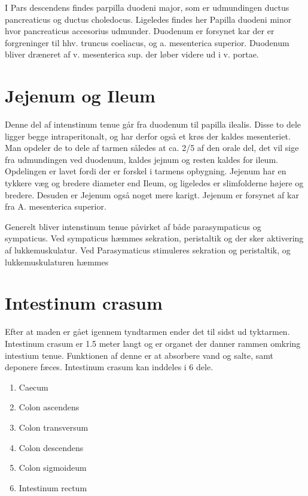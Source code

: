 	I Pars descendens findes parpilla duodeni major, som er udmundingen ductus pancreaticus og ductus choledocus. Ligeledes findes her Papilla duodeni minor hvor pancreaticus accesorius udmunder. Duodenum er forsynet kar der er forgreninger til hhv. truncus coeliacus, og a. mesenterica superior. Duodenum bliver dræneret af v. mesenterica sup. der løber videre ud i v. portae.
	
	\section{Jejenum og Ileum}
	
	Denne del af intenstinum tenue går fra duodenum til papilla ilealis. Disse to dele ligger begge intraperitonalt, og har derfor også et krøs der kaldes mesenteriet. Man opdeler de to dele af tarmen således at ca. 2/5 af den orale del, det vil sige fra udmundingen ved duodenum, kaldes jejnum og resten kaldes for ileum. Opdelingen er lavet fordi der er forskel i tarmens opbygning. Jejenum har en tykkere væg og bredere diameter end Ileum, og ligeledes er slimfolderne højere og bredere. Desuden er Jejenum også noget mere karigt. Jejenum er forsynet af kar fra A. mesenterica superior.
	
	
	Generelt bliver intenstinum tenue påvirket af både parasympaticus og sympaticus. Ved sympaticus hæmmes sekration, peristaltik og der sker aktivering af lukkemuskulatur. Ved Parasymaticus stimuleres sekration og peristaltik, og lukkemuskulaturen hæmmes
	
	\section{Intestinum crasum}
	Efter at maden er gået igennem tyndtarmen ender det til sidst ud tyktarmen. Intestinum crasum er 1.5 meter langt og er organet der danner rammen omkring intestium tenue. Funktionen af denne er at absorbere vand og salte, samt deponere fæces. Intestinum crasum kan inddeles i 6 dele.
	
	\begin{enumerate}
		\item Caecum
		\item Colon ascendens
		\item Colon transversum
		\item Colon descendens
		\item Colon sigmoideum
		\item Intestinum rectum 
	\end{enumerate}
	
